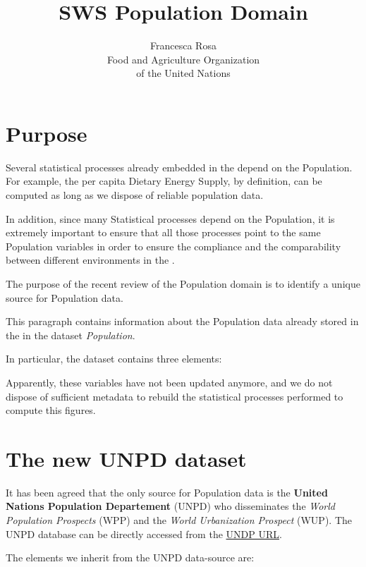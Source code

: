 \documentclass[nojss]{jss}\usepackage[]{graphicx}\usepackage[]{color}
\title{\bf{SWS Population Domain} }
\author{Francesca Rosa\\ Food and Agriculture
    Organization \\ of the United Nations\\}
\begin{document}
\section{Purpose}
Several statistical processes already embedded in the  depend on the Population. For example, the per capita Dietary Energy Supply, by definition, can be computed as long as we dispose of reliable population data.

In addition, since many Statistical processes depend on the Population, it is extremely important to ensure that all those processes point to the same Population variables in order to ensure the compliance and the comparability between different environments in the .


The purpose of the recent review of the Population domain is to identify a unique source for Population data.

This paragraph contains information about the Population data already stored in the  in the dataset \textit{Population}.

In particular, the dataset  contains three elements:

\begin{itemize}
\item{\textit{Total Population} []}
\item{\textit{Food balance sheets population},  [\code{element-code 21]}
\item{\textit{Weighted Total Population},  [\code{element-code 511]}
\end{itemize}

Apparently, these variables have not been updated anymore, and we do not dispose of sufficient metadata to rebuild the statistical processes performed to compute this figures.


\section{The new UNPD dataset}

It has been agreed that the only source for Population data is the \textbf{United Nations Population Departement} (UNPD) who disseminates the \textit{World Population Prospects} (WPP) and the \textit{World Urbanization Prospect} (WUP).
The UNPD database can be directly accessed from the \href{http://www.un.org/en/development/desa/population/publications/database/index.shtml}{UNDP URL}.


The elements we inherit from the UNPD data-source are:
\end{document}
